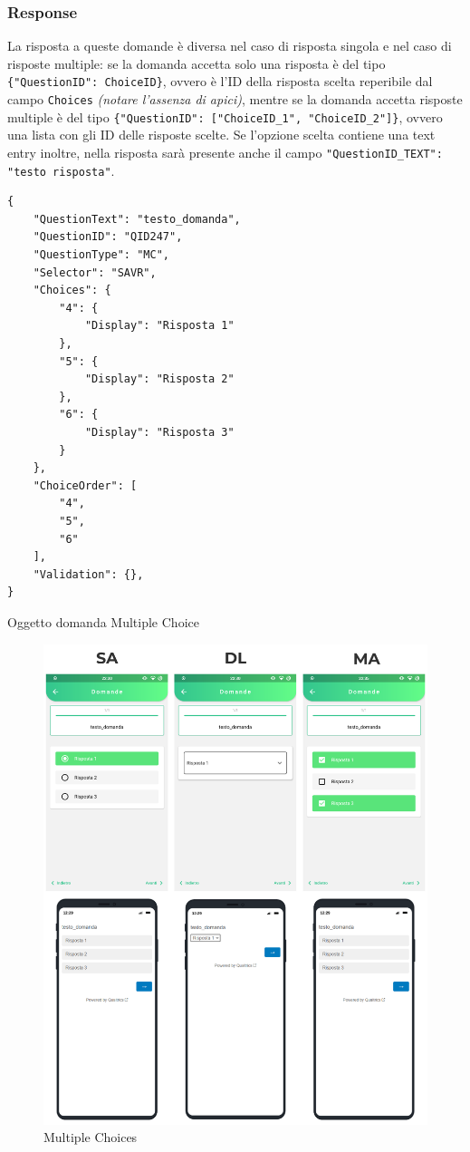 \subsubsection{Response}
La risposta a queste domande è diversa nel caso di risposta singola e nel caso di risposte multiple: se la domanda accetta solo una risposta è del tipo \texttt{\{"QuestionID": ChoiceID\}}, ovvero è l'ID della risposta scelta reperibile dal campo \texttt{Choices} \textit{(notare l'assenza di apici)}, mentre se la domanda accetta risposte multiple è del tipo \texttt{\{"QuestionID": ["ChoiceID\_1", "ChoiceID\_2"]\}}, ovvero una lista con gli ID delle risposte scelte. Se l'opzione scelta contiene una text entry inoltre, nella risposta sarà presente anche il campo \texttt{"QuestionID\_TEXT": "testo risposta"}.

\begin{json}
\begin{verbatim}
{
    "QuestionText": "testo_domanda",
    "QuestionID": "QID247",
    "QuestionType": "MC",
    "Selector": "SAVR",
    "Choices": {
        "4": {
            "Display": "Risposta 1"
        },
        "5": {
            "Display": "Risposta 2"
        },
        "6": {
            "Display": "Risposta 3"
        }
    },
    "ChoiceOrder": [
        "4",
        "5",
        "6"
    ],
    "Validation": {},
}
\end{verbatim}
\caption{Oggetto domanda Multiple Choice}
\label{json:mc}
\end{json}

\begin{figure}[ht!]
\centering
\includegraphics[width=\textwidth]{img/mc_flutter}
\caption{Multiple Choices}
\label{fig:mc}
\end{figure}

